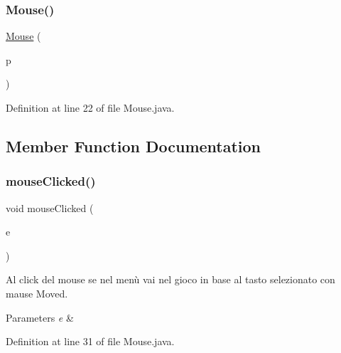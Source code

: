 \subsubsection{\texorpdfstring{Mouse()}{Mouse()}}
{\footnotesize\ttfamily \hyperlink{classa_1_1survival_1_1game_1_1_mouse}{Mouse} (\begin{DoxyParamCaption}\item[{\hyperlink{classa_1_1survival_1_1game_1_1_pannello}{Pannello}}]{p }\end{DoxyParamCaption})}



Definition at line 22 of file Mouse.\+java.



\subsection{Member Function Documentation}
\mbox{\label{classa_1_1survival_1_1game_1_1_mouse_a45d56bd84238e8b56589dfc732e2b2cf}} 
\subsubsection{\texorpdfstring{mouse\+Clicked()}{mouseClicked()}}
{\footnotesize\ttfamily void mouse\+Clicked (\begin{DoxyParamCaption}\item[{Mouse\+Event}]{e }\end{DoxyParamCaption})}



Al click del mouse se nel menù vai nel gioco in base al tasto selezionato con mause Moved. 


\begin{DoxyParams}{Parameters}
{\em e} & \\
\hline
\end{DoxyParams}


Definition at line 31 of file Mouse.\+java.

